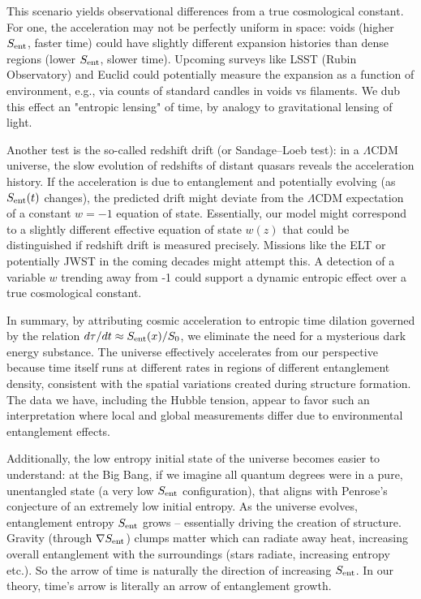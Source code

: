 \documentclass[11pt]{article}
\begin{document}
This scenario yields observational differences from a true cosmological constant. For one, the acceleration may not be perfectly uniform in space: voids (higher $S_{\rm ent}$, faster time) could have slightly different expansion histories than dense regions (lower $S_{\rm ent}$, slower time). Upcoming surveys like LSST (Rubin Observatory) and Euclid could potentially measure the expansion as a function of environment, e.g., via counts of standard candles in voids vs filaments. We dub this effect an "entropic lensing" of time, by analogy to gravitational lensing of light.

Another test is the so-called redshift drift (or Sandage–Loeb test): in a $\Lambda$CDM universe, the slow evolution of redshifts of distant quasars reveals the acceleration history. If the acceleration is due to entanglement and potentially evolving (as $S_{\rm ent}(t)$ changes), the predicted drift might deviate from the $\Lambda$CDM expectation of a constant $w=-1$ equation of state. Essentially, our model might correspond to a slightly different effective equation of state $w(z)$ that could be distinguished if redshift drift is measured precisely. Missions like the ELT or potentially JWST in the coming decades might attempt this. A detection of a variable $w$ trending away from -1 could support a dynamic entropic effect over a true cosmological constant.

In summary, by attributing cosmic acceleration to entropic time dilation governed by the relation $d\tau/dt \approx S_{\rm ent}(x) / S_0$, we eliminate the need for a mysterious dark energy substance. The universe effectively accelerates from our perspective because time itself runs at different rates in regions of different entanglement density, consistent with the spatial variations created during structure formation. The data we have, including the Hubble tension, appear to favor such an interpretation where local and global measurements differ due to environmental entanglement effects.

Additionally, the low entropy initial state of the universe becomes easier to understand: at the Big Bang, if we imagine all quantum degrees were in a pure, unentangled state (a very low $S_{\rm ent}$ configuration), that aligns with Penrose’s conjecture of an extremely low initial entropy. As the universe evolves, entanglement entropy $S_{\rm ent}$ grows – essentially driving the creation of structure. Gravity (through $\nabla S_{\rm ent}$) clumps matter which can radiate away heat, increasing overall entanglement with the surroundings (stars radiate, increasing entropy etc.). So the arrow of time is naturally the direction of increasing $S_{\rm ent}$. In our theory, time’s arrow is literally an arrow of entanglement growth.
\end{document}
